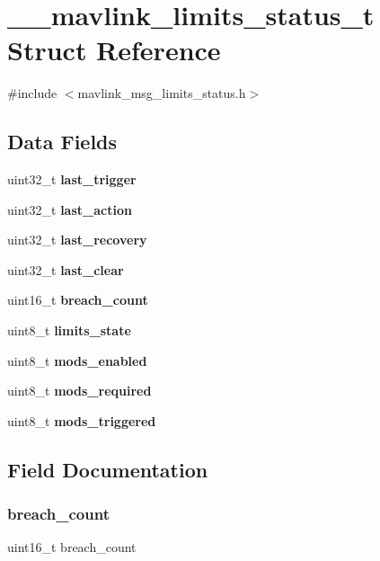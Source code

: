 \section{\+\_\+\+\_\+mavlink\+\_\+limits\+\_\+status\+\_\+t Struct Reference}
\label{struct____mavlink__limits__status__t}


{\ttfamily \#include $<$mavlink\+\_\+msg\+\_\+limits\+\_\+status.\+h$>$}

\subsection*{Data Fields}
\begin{DoxyCompactItemize}
\item 
uint32\+\_\+t \textbf{ last\+\_\+trigger}
\item 
uint32\+\_\+t \textbf{ last\+\_\+action}
\item 
uint32\+\_\+t \textbf{ last\+\_\+recovery}
\item 
uint32\+\_\+t \textbf{ last\+\_\+clear}
\item 
uint16\+\_\+t \textbf{ breach\+\_\+count}
\item 
uint8\+\_\+t \textbf{ limits\+\_\+state}
\item 
uint8\+\_\+t \textbf{ mods\+\_\+enabled}
\item 
uint8\+\_\+t \textbf{ mods\+\_\+required}
\item 
uint8\+\_\+t \textbf{ mods\+\_\+triggered}
\end{DoxyCompactItemize}


\subsection{Field Documentation}
\mbox{\label{struct____mavlink__limits__status__t_a8f5bd70e75e4bfa82927a70c0225e9e7}} 
\subsubsection{breach\+\_\+count}
{\footnotesize\ttfamily uint16\+\_\+t breach\+\_\+count}

\mbox{\label{struct____mavlink__limits__status__t_a4e394f76691a724b0e50d55b05e25f2d}} 
